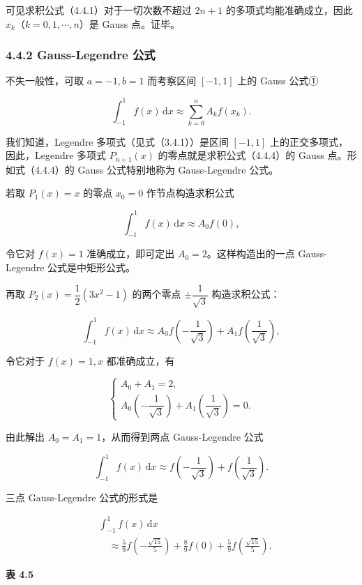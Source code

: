 可见求积公式（4.4.1）对于一切次数不超过 \(2n+1\) 的多项式均能准确成立，因此 \(x_k\)（\(k=0,1,\cdots,n\)）是 Gauss 点。证毕。

\subsubsection{4.4.2 Gauss-Legendre 公式}\label{ch04b-gauss-legendre-ux516cux5f0f}

不失一般性，可取 \(a=-1,b=1\) 而考察区间 \([-1,1]\) 上的 Gauss 公式①

\[
\int_{-1}^{1}f(x)\,\mathrm{d}x\approx\sum_{k=0}^{n}A_kf(x_k).
\tag{4.4.4}
\]

我们知道，Legendre 多项式（见式（3.4.1））是区间 \([-1,1]\) 上的正交多项式，因此，Legendre 多项式 \(P_{n+1}(x)\) 的零点就是求积公式（4.4.4）的 Gauss 点。形如式（4.4.4）的 Gauss 公式特别地称为 Gauss-Legendre 公式。

若取 \(P_1(x)=x\) 的零点 \(x_0=0\) 作节点构造求积公式

\[
\int_{-1}^{1}f(x)\,\mathrm{d}x\approx A_0f(0),
\]

令它对 \(f(x)=1\) 准确成立，即可定出 \(A_0=2\)。这样构造出的一点 Gauss-Legendre 公式是中矩形公式。

再取 \(P_2(x)=\dfrac12(3x^2-1)\) 的两个零点 \(\pm\dfrac1{\sqrt3}\) 构造求积公式：

\[
\int_{-1}^{1}f(x)\,\mathrm{d}x\approx
A_0f\left(-\frac1{\sqrt3}\right)+A_1f\left(\frac1{\sqrt3}\right),
\]

令它对于 \(f(x)=1,x\) 都准确成立，有

\[
\begin{cases}
A_0+A_1=2,\\[3pt]
A_0\left(-\dfrac1{\sqrt3}\right)+A_1\left(\dfrac1{\sqrt3}\right)=0.
\end{cases}
\]

由此解出 \(A_0=A_1=1\)，从而得到两点 Gauss-Legendre 公式

\[
\int_{-1}^{1}f(x)\,\mathrm{d}x\approx
f\left(-\frac1{\sqrt3}\right)+f\left(\frac1{\sqrt3}\right).
\]

三点 Gauss-Legendre 公式的形式是

\[
\begin{aligned}
&\int_{-1}^{1}f(x)\,\mathrm{d}x\\
&\quad\approx\frac59f\left(-\frac{\sqrt{15}}5\right)
+\frac89f(0)+\frac59f\left(\frac{\sqrt{15}}5\right).
\end{aligned}
\]

\textbf{表 4.5}

